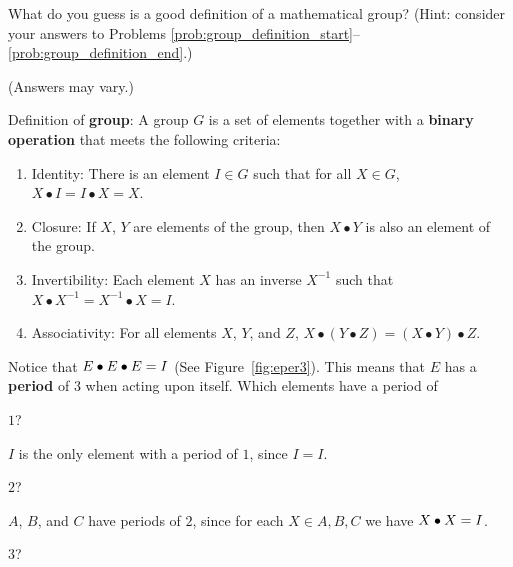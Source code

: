 \documentclass[../key.tex]{subfiles}
\begin{document}
\begin{outer_problem}
\item What do you guess is a good definition of a mathematical group? (Hint: consider your answers to Problems \ref{prob:group_definition_start}--\ref{prob:group_definition_end}.)
\end{outer_problem}

\noindent (Answers may vary.)

Definition of \textbf{group}: A group $G$ is a set of elements together with a \textbf{binary operation} that meets the following criteria:
\begin{enumerate}[label=(\alph*)]
\item Identity: There is an element $I\in G$ such that for all $X\in G$, $X\bullet I = I\bullet X = X$.
\item Closure: If $X$, $Y$ are elements of the group, then $X\bullet Y$ is also an element of the group.
\item Invertibility: Each element $X$ has an inverse $X^{-1}$ such that $X\bullet X^{-1} = X^{-1}\bullet X = I$.
\item Associativity: For all elements $X$, $Y$, and $Z$, $X\bullet (Y\bullet Z) = (X\bullet Y) \bullet Z$.
\end{enumerate}

\begin{outer_problem}
\item Notice that $E\bullet E\bullet E=I$ (See Figure~\ref{fig:eper3}). This means that $E$ has a \textbf{period} of $3$ when acting upon itself. Which elements have a period of
\end{outer_problem}

\begin{inner_problem}[start=1]
	 \item $1$?
\end{inner_problem}

\noindent $I$ is the only element with a period of $1$, since $I=I$.

\begin{inner_problem}
	 \item $2$?
\end{inner_problem}

\noindent $A$, $B$, and $C$ have periods of $2$, since for each $X\in{A,B,C}$ we have $X\bullet X = I$.

\begin{inner_problem}
	 \item $3$?
\end{inner_problem}
\end{document}
